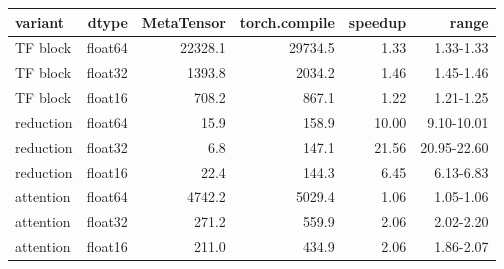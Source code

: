 \begin{tabular}{lrrrrr}
\toprule
variant & dtype & MetaTensor & torch.compile & speedup & range \\
\midrule
TF block & float64 & 22328.1 & 29734.5 & 1.33 & 1.33-1.33 \\
TF block & float32 & 1393.8 & 2034.2 & 1.46 & 1.45-1.46 \\
TF block & float16 & 708.2 & 867.1 & 1.22 & 1.21-1.25 \\
reduction & float64 & 15.9 & 158.9 & 10.00 & 9.10-10.01 \\
reduction & float32 & 6.8 & 147.1 & 21.56 & 20.95-22.60 \\
reduction & float16 & 22.4 & 144.3 & 6.45 & 6.13-6.83 \\
attention & float64 & 4742.2 & 5029.4 & 1.06 & 1.05-1.06 \\
attention & float32 & 271.2 & 559.9 & 2.06 & 2.02-2.20 \\
attention & float16 & 211.0 & 434.9 & 2.06 & 1.86-2.07 \\
\bottomrule
\end{tabular}
